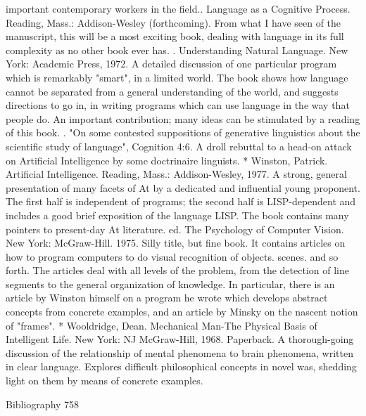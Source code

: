   important contemporary workers in the field.. Language as a Cognitive Process.
  Reading, Mass.: Addison-Wesley (forthcoming). From what I have seen of the
  manuscript, this will be a most exciting book, dealing with language in its full
  complexity as no other book ever has. . Understanding Natural Language. New York:
  Academic Press, 1972. A detailed discussion of one particular program which is
  remarkably "smart", in a limited world. The book shows how language cannot be
  separated from a general understanding of the world, and suggests directions to go in, in
  writing programs which can use language in the way that people do. An important
  contribution; many ideas can be stimulated by a reading of this book.
. "On some contested suppositions of generative linguistics about the scientific study of
  language", Cognition 4:6. A droll rebuttal to a head-on attack on Artificial Intelligence
  by some doctrinaire linguists.
* Winston, Patrick. Artificial Intelligence. Reading, Mass.: Addison-Wesley, 1977. A
  strong, general presentation of many facets of At by a dedicated and influential young
  proponent. The first half is independent of programs; the second half is LISP-dependent
  and includes a good brief exposition of the language LISP. The book contains many
  pointers to present-day At literature. ed. The Psychology of Computer Vision. New
  York: McGraw-Hill. 1975. Silly title, but fine book. It contains articles on how to
  program computers to do visual recognition of objects. scenes. and so forth. The articles
  deal with all levels of the problem, from the detection of line segments to the general
  organization of knowledge. In particular, there is an article by Winston himself on a
  program he wrote which develops abstract concepts from concrete examples, and an
  article by Minsky on the nascent notion of "frames".
* Wooldridge, Dean. Mechanical Man-The Physical Basis of Intelligent Life. New York:
  NJ McGraw-Hill, 1968. Paperback. A thorough-going discussion of the relationship of
  mental phenomena to brain phenomena, written in clear language. Explores difficult
  philosophical concepts in novel was, shedding light on them by means of concrete
  examples.




Bibliography                                                                           758

